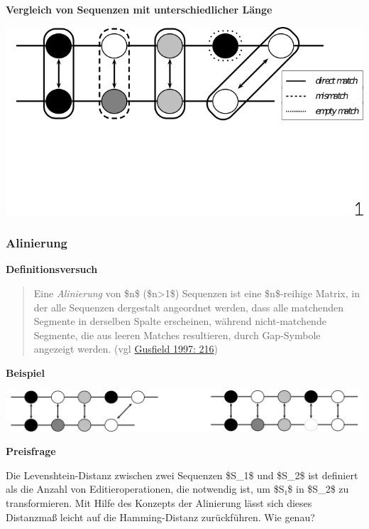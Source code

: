 \par\noindent\textbf{Vergleich von Sequenzen mit unterschiedlicher Länge}

\href{img/matchings.png}{\includegraphics{img/matchings.png}}


\subsubsection{\texorpdfstring{{Alinierung}}{Alinierung}}

\par\noindent\textbf{Definitionsversuch}

\begin{quote}
Eine \emph{Alinierung} von \$n\$ (\$n\textgreater{}1\$) Sequenzen ist
eine \$n\$-reihige Matrix, in der alle Sequenzen dergestalt angeordnet
werden, dass alle matchenden Segmente in derselben Spalte erscheinen,
während nicht-matchende Segmente, die aus leeren Matches resultieren,
durch Gap-Symbole angezeigt werden. (vgl
\href{http://bibliography.lingpy.org?key=Gusfield1997}{Gusfield 1997:
216})
\end{quote}



\par\noindent\textbf{Beispiel}

\includegraphics[width=\textwidth]{img/alignment.pdf}



\par\noindent\textbf{Preisfrage}

Die Levenshtein-Distanz zwischen zwei Sequenzen \$S\_1\$ und \$S\_2\$
ist definiert als die Anzahl von Editieroperationen, die notwendig ist,
um \$S₁\$ in \$S\_2\$ zu transformieren. Mit Hilfe des Konzepts der
Alinierung lässt sich dieses Distanzmaß leicht auf die Hamming-Distanz
zurückführen. Wie genau?



